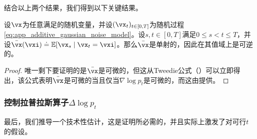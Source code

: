 \documentclass[../../book-main_zh.tex]{subfiles}
\begin{document}
结合以上两个结果，我们得到以下关键结果。

\begin{corollary}\label{cor:gribonval_A2}
    设\(\vx\)为任意满足的随机变量，并设\((\vx_{t})_{t \in [0, T]}\)为随机过程\eqref{eq:app_additive_gaussian_noise_model}。设\(s, t \in [0, T]\)满足\(0 \leq s < t \leq T\)，并设\(\bar{\vx}(\vxi) \doteq \Ex[\vx_{s} \mid \vx_{t} = \vxi]\)。那么\(\bar{\vx}\)是单射的，因此在其值域上是可逆的。
\end{corollary}
\begin{proof}
    唯一剩下要证明的是\(\bar{\vx}\)是可微的，但这从Tweedie公式（）可以立即得出，该公式表明\(\bar{\vx}\)是可微的当且仅当\(\nabla \log p_{t}\)是可微的，而这由提供。
\end{proof}

\subsubsection{控制拉普拉斯算子\(\Delta \log p_{t}\)}

最后，我们推导一个技术性估计，这是证明所必需的，并且实际上激发了对可行\(t\)的假设。
\end{document}
